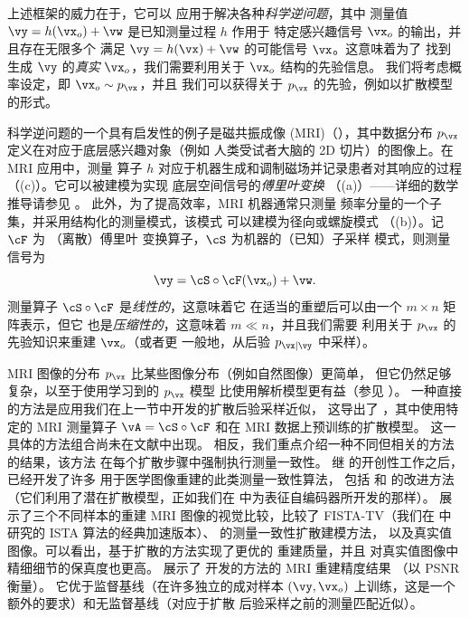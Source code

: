 \documentclass[../../book-main_zh.tex]{subfiles}
\begin{document}
上述框架的威力在于，它可以
应用于解决各种\textit{科学逆问题}，其中
测量值
$\vy = h(\vx_o) + \vw$ 是已知测量过程 $h$ 作用于
特定感兴趣信号 $\vx_o$ 的输出，并且存在无限多个
满足 $\vy = h(\vx) + \vw$ 的可能信号 $\vx$。这意味着为了
找到生成 $\vy$ 的\textit{真实} $\vx_o$，我们需要利用关于
$\vx_o$ 结构的先验信息。
我们将考虑概率设定，即 $\vx_o \sim p_{\vx}$，并且
我们可以获得关于 $p_{\vx}$ 的先验，例如以扩散模型的形式。

科学逆问题的一个具有启发性的例子是磁共振成像 (MRI)（），其中数据分布
$p_{\vx}$ 定义在对应于底层感兴趣对象（例如
人类受试者大脑的 2D 切片）的图像上。在 MRI 应用中，测量
算子 $h$ 对应于机器生成和调制磁场并记录患者对其响应的过程
（(c)）。它可以被建模为实现
底层空间信号的\textit{傅里叶变换}
（(a)）——详细的数学推导请参见 \cite[第 10 章]{Wright-Ma-2022}。
此外，为了提高效率，MRI 机器通常只测量
频率分量的一个子集，并采用结构化的测量模式，该模式
可以建模为径向或螺旋模式
（(b)）。记 $\cF$ 为
（离散）傅里叶
变换算子，$\cS$ 为机器的（已知）子采样
模式，则测量信号为
\begin{equation}\label{eq:mri-measurement}
    \vy = \cS \circ \cF(\vx_o) + \vw.
\end{equation}
测量算子 $\cS \circ \cF$ 是\textit{线性的}，这意味着它
在适当的重塑后可以由一个 $m \times n$ 矩阵表示，但它
也是\textit{压缩性的}，这意味着 $m \ll n$，并且我们需要
利用关于 $p_{\vx}$ 的先验知识来重建 $\vx_o$（或者更
一般地，从后验 $p_{\vx \mid \vy}$ 中采样）。

MRI 图像的分布
$p_{\vx}$ 比某些图像分布（例如自然图像）更简单，
但它仍然足够复杂，以至于使用学习到的 $p_{\vx}$ 模型
比使用解析模型更有益（参见 \cite{Wright-Ma-2022}）。
一种直接的方法是应用我们在上一节中开发的扩散后验采样近似，
这导出了
，其中使用特定的 MRI
测量算子 $\vA = \cS \circ \cF$ 和在 MRI 数据上预训练的扩散模型。
这一具体的方法组合尚未在文献中出现。
相反，我们重点介绍一种不同但相关的方法的结果，该方法
在每个扩散步骤中强制执行测量一致性。
继 \textcite{song2022solving} 的开创性工作之后，已经开发了许多
用于医学图像重建的此类测量一致性算法，
包括 \textcite{song2024solving} 和
\textcite{rout2023solving} 的改进方法（它们利用了潜在扩散模型，正如我们在
 中为表征自编码器所开发的那样）。
 展示了三个不同样本的重建
MRI 图像的视觉比较，比较了 FISTA-TV（我们在
 中研究的 ISTA 算法的经典加速版本）、
\textcite{song2022solving} 的测量一致性扩散建模方法，
以及真实值图像。可以看出，基于扩散的方法实现了更优的
重建质量，并且
对真实值图像中精细细节的保真度也更高。
 展示了 \textcite{song2022solving} 开发的方法的 MRI 重建精度结果
（以 PSNR 衡量）。
它优于监督基线（在许多独立的成对样本 $(\vy,
\vx_o)$ 上训练，这是一个额外的要求）和无监督基线（对应于扩散
后验采样之前的测量匹配近似）。
\end{document}
